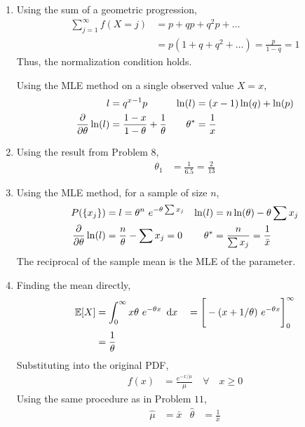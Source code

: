 \begin{enumerate}
    \item Using the sum of a geometric progression,
          \begin{align}
              \sum_{j=1}^{\infty} f(X=j) & = p + qp + q^2p + \dots                  \\
                                         & = p(1 + q + q^2 + \dots) = \frac{p}{1-q}
              = 1
          \end{align}
          Thus, the normalization condition holds. \par
          Using the MLE method on a single observed value $ X = x$,
          \begin{align}
              l                       & = q^{x-1}p                                &
              \ln(l)                  & = (x-1) \ln(q) + \ln(p)                     \\
              \diffp*{\ln(l)}{\theta} & = \frac{1-x}{1-\theta} + \frac{1}{\theta} &
              \theta^*                & = \frac{1}{x}
          \end{align}

    \item Using the result from Problem 8,
          \begin{align}
              \theta_1 & = \frac{1}{6.5} = \frac{2}{13}
          \end{align}

    \item Using the MLE method, for a sample of size $ n $,
          \begin{align}
              P(\{x_j\})              & = l = \theta^n\ e^{-\theta \sum x_j}     &
              \ln(l)                  & = n\ln(\theta) - \theta \sum x_j           \\
              \diffp*{\ln(l)}{\theta} & = \frac{n}{\theta} - \sum x_j = 0        &
              \theta^*                & = \frac{n}{\sum x_j} = \frac{1}{\bar{x}}
          \end{align}
          The reciprocal of the sample mean is the MLE of the parameter.

    \item Finding the mean directly,
          \begin{align}
              \ex[X] & = \infint x\theta\ e^{-\theta x}\ \dl x             &
                     & = \Bigg[-(x+1/\theta)\ e^{-\theta x}\Bigg]_0^\infty   \\
                     & = \frac{1}{\theta}
          \end{align}
          Substituting into the original PDF,
          \begin{align}
              f(x) & = \frac{e^{-x/\mu}}{\mu} \quad \forall \quad x \geq 0
          \end{align}
          Using the same procedure as in Problem $ 11 $,
          \begin{align}
              \hat{\mu} & = \bar{x} & \hat{\theta} & = \frac{1}{\bar{x}}
          \end{align}


\end{enumerate}
